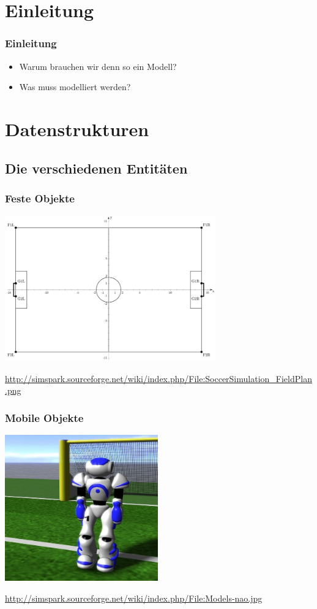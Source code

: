\begin{frame}
\tableofcontents
\end{frame}

\section{Einleitung}
\frame
{\frametitle{Einleitung}
\begin{itemize}
    \item Warum brauchen wir denn so ein Modell?
    \item Was muss modelliert werden?
\end{itemize}
}

\section{Datenstrukturen}
\subsection{Die verschiedenen Entitäten}

\frame
{\frametitle{Feste Objekte}
\begin{center}\includegraphics[height=6.3cm, center]{800px-SoccerSimulation_FieldPlan.png}\end{center}
\url{http://simspark.sourceforge.net/wiki/index.php/File:SoccerSimulation_FieldPlan.png}
}

\frame
{\frametitle{Mobile Objekte}
\begin{center}\includegraphics[height=6.3cm, center]{629px-Models-nao.jpg}\end{center}
\url{http://simspark.sourceforge.net/wiki/index.php/File:Models-nao.jpg}		%
}
